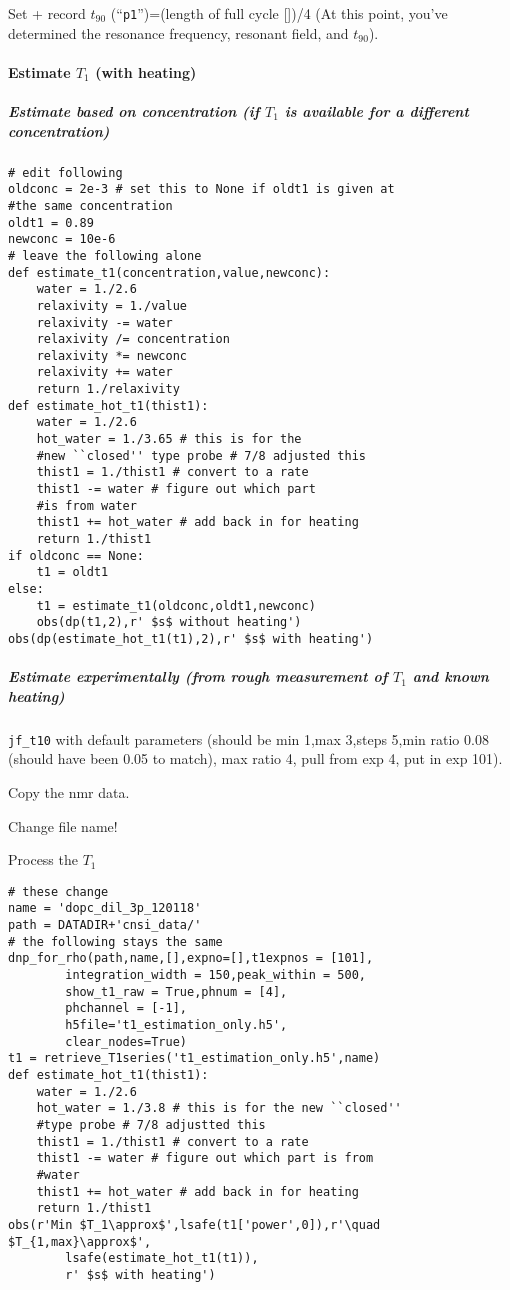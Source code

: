 Set + record $t_{90}$ (``\texttt{p1}'')=(length of full cycle [\us])/4 (At this point, you've determined the resonance frequency, resonant field, and $t_{90}$).

\paragraph{Estimate $T_1$ (with heating)}

\subparagraph{Estimate based on concentration {\tiny (if $T_1$ is available for a different concentration)}}

\begin{lstlisting}
# edit following
oldconc = 2e-3 # set this to None if oldt1 is given at
#the same concentration
oldt1 = 0.89
newconc = 10e-6
# leave the following alone
def estimate_t1(concentration,value,newconc):
    water = 1./2.6
    relaxivity = 1./value
    relaxivity -= water
    relaxivity /= concentration
    relaxivity *= newconc
    relaxivity += water
    return 1./relaxivity
def estimate_hot_t1(thist1):
    water = 1./2.6
    hot_water = 1./3.65 # this is for the
    #new ``closed'' type probe # 7/8 adjusted this
    thist1 = 1./thist1 # convert to a rate
    thist1 -= water # figure out which part
    #is from water
    thist1 += hot_water # add back in for heating
    return 1./thist1
if oldconc == None:
    t1 = oldt1
else:
    t1 = estimate_t1(oldconc,oldt1,newconc)
    obs(dp(t1,2),r' $s$ without heating')
obs(dp(estimate_hot_t1(t1),2),r' $s$ with heating')
\end{lstlisting}

\subparagraph{Estimate experimentally (from rough measurement of $T_1$ and known heating)}
\texttt{jf\_t10} with default parameters (should be min 1,max 3,steps 5,min ratio 0.08 (should have been 0.05 to match), max ratio 4, pull from exp 4, put in exp 101).

Copy the nmr data.

Change file name!

Process the $T_1$

\begin{scriptsize}
\begin{lstlisting}
# these change
name = 'dopc_dil_3p_120118'
path = DATADIR+'cnsi_data/'
# the following stays the same
dnp_for_rho(path,name,[],expno=[],t1expnos = [101],
        integration_width = 150,peak_within = 500,
        show_t1_raw = True,phnum = [4],
        phchannel = [-1],
        h5file='t1_estimation_only.h5',
        clear_nodes=True)
t1 = retrieve_T1series('t1_estimation_only.h5',name)
def estimate_hot_t1(thist1):
    water = 1./2.6
    hot_water = 1./3.8 # this is for the new ``closed''
    #type probe # 7/8 adjustted this
    thist1 = 1./thist1 # convert to a rate
    thist1 -= water # figure out which part is from
    #water
    thist1 += hot_water # add back in for heating
    return 1./thist1
obs(r'Min $T_1\approx$',lsafe(t1['power',0]),r'\quad $T_{1,max}\approx$',
        lsafe(estimate_hot_t1(t1)),
        r' $s$ with heating')
\end{lstlisting}
\end{scriptsize}

